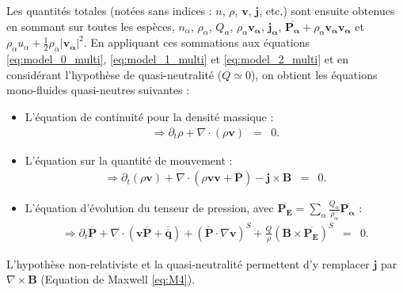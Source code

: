 Les quantités totales (notées sans indices : $n$, $\rho$, $\boldsymbol{v}$, $\boldsymbol{j}$, etc.) sont ensuite obtenues en sommant sur toutes les espèces, $n_{\alpha}$, $\rho_{\alpha}$, $Q_{\alpha}$, $\rho_{\alpha} \boldsymbol{v_{\alpha}}$, $\boldsymbol{j_{\alpha}}$, $\overline{\boldsymbol{P_{\alpha}}} +  \rho_{\alpha} \boldsymbol{v_{\alpha}}\boldsymbol{v_{\alpha}}$ et $\rho_{\alpha} u_{\alpha} + \frac{1}{2} \rho_{\alpha} |\boldsymbol{v_{\alpha}}|^2$.  En appliquant ces sommations aux équations \eqref{eq:model_0_multi}, \eqref{eq:model_1_multi} et \eqref{eq:model_2_multi} et en considérant l'hypothèse de quasi-neutralité ($Q \simeq 0$), on obtient les équations mono-fluides quasi-neutres suivantes :
\begin{itemize}
    \item L'équation de continuité pour la densité massique :
\begin{eqnarray}
  \label{eq:model_0_mono} \Rightarrow \partial_t \rho + \nabla \cdot \left(\rho \boldsymbol{v}\right) &=& 0 .
 \end{eqnarray}
    \item L'équation sur la quantité de mouvement :
\begin{eqnarray}
\label{eq:model_1_mono} \Rightarrow \partial_t \left(\rho \boldsymbol{v}\right) + \nabla \cdot \left(\rho \boldsymbol{v}\boldsymbol{v} + \overline{\boldsymbol{P}}\right) - \boldsymbol{j} \times \boldsymbol{B} &=& 0 .
 \end{eqnarray}
 \item L'équation d'évolution du tenseur de pression, avec $\overline{\boldsymbol{P_E}} = \sum_{\alpha} \frac{Q_{\alpha}}{\rho_{\alpha}} \overline{\boldsymbol{P_{\alpha}}}$ :
\begin{eqnarray}
 \label{eq:model_2_mono} \Rightarrow \partial_t \overline{\boldsymbol{P}} + \nabla \cdot \left(\boldsymbol{v}\overline{\boldsymbol{P}} + \overline{\overline{\boldsymbol{q}}}\right) + \left(\overline{\boldsymbol{P}} \cdot \nabla \boldsymbol{v}\right)^S +  \frac{Q}{\rho} \left(\boldsymbol{B}\times \overline{\boldsymbol{P_E}}\right)^S  &=& 0 .
\end{eqnarray}
\end{itemize}
L'hypothèse non-relativiste et la quasi-neutralité permettent d'y remplacer $\boldsymbol{j}$ par $\nabla \times \boldsymbol{B}$ (Equation de Maxwell \eqref{eq:M4}).

